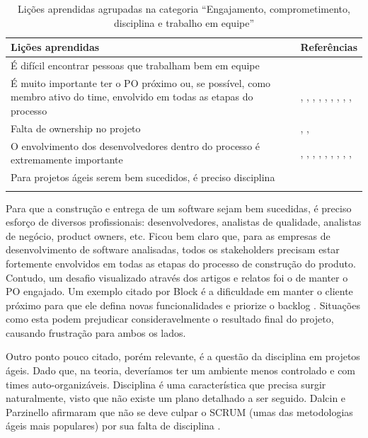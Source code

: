 \begin{table}[H]
	\centering
	\captionsetup{justification=centering}
	\begin{tabularx}{\linewidth}{ | X | p{5cm} | } \hline \textbf{Lições aprendidas} & \textbf{Referências} \\ \hline
		É difícil encontrar pessoas que trabalham bem em equipe & \cite{Block2011} \\ \hline
		É muito importante ter o PO próximo ou, se possível, como membro ativo do time, envolvido em todas as etapas do processo & \cite{Block2011}, \cite{Asnawi2012}, \cite{Lapham2012}, \cite{Microsoft2013}, \cite{Claudia2013}, \cite{Piegas2012}, \cite{Parzinello2012}, \cite{Stefano2013}, \cite{Rodrigues2013}, \cite{Maciel2013} \\ \hline
		Falta de ownership no projeto & \cite{Block2011}, \cite{Nokia2013}, \cite{Queiroz2013} \\ \hline
		O envolvimento dos desenvolvedores dentro do processo é extremamente importante & \cite{Asnawi2012}, \cite{Adobe2012}, \cite{Fitzgerald2013}, \cite{Lapham2012}, \cite{Microsoft2013}, \cite{Claudia2013}, \cite{Stefano2013}, \cite{Bastos2013}, \cite{Maciel2013}, \cite{Ahmed2008} \\ \hline
		Para projetos ágeis serem bem sucedidos, é preciso disciplina & \cite{Parzinello2012} \\ \hline
	\caption{Lições aprendidas agrupadas na categoria ``Engajamento, comprometimento, disciplina e trabalho em equipe''}
	\end{tabularx}
\end{table}

%

Para que a construção e entrega de um software sejam bem sucedidas, é preciso esforço de diversos profissionais: desenvolvedores, analistas de qualidade, analistas de negócio, product owners, etc. Ficou bem claro que, para as empresas de desenvolvimento de software analisadas, todos os stakeholders precisam estar fortemente envolvidos em todas as etapas do processo de construção do produto. Contudo, um desafio visualizado através dos artigos e relatos foi o de manter o PO engajado. Um exemplo citado por Block é a dificuldade em manter o cliente próximo para que ele defina novas funcionalidades e priorize o backlog \cite{Block2011}. Situações como esta podem prejudicar consideravelmente o resultado final do projeto, causando frustração para ambos os lados.

Outro ponto pouco citado, porém relevante, é a questão da disciplina em projetos ágeis. Dado que, na teoria, deveríamos ter um ambiente menos controlado e com times auto-organizáveis. Disciplina é uma característica que precisa surgir naturalmente, visto que não existe um plano detalhado a ser seguido. Dalcin e Parzinello afirmaram que não se deve culpar o SCRUM (umas das metodologias ágeis mais populares) por sua falta de disciplina \cite{Parzinello2012}.

